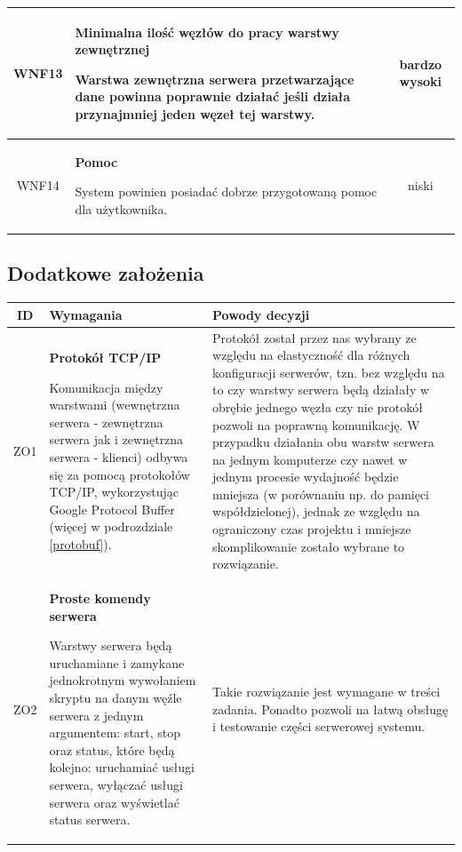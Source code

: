{\begin{tabularx}{\textwidth}{|c|X|c|}
\label{z:WNF13} WNF13 & \textbf{Minimalna ilość węzłów do pracy warstwy zewnętrznej} 
 
Warstwa zewnętrzna serwera przetwarzające dane powinna poprawnie działać jeśli działa przynajmniej jeden węzeł tej warstwy.
 & bardzo wysoki\\
\hline

\label{z:WNF14} WNF14 & \textbf{Pomoc} 
 
System powinien posiadać dobrze przygotowaną pomoc dla użytkownika.
 & niski \\
\hline

\end{tabularx}


\subsection[Dodatkowe założenia]{Dodatkowe założenia}

\begin{tabularx}{\textwidth}{|c|X|X|}
\hline
\textbf{ID} & \textbf{Wymagania}  & \textbf{Powody decyzji} \\
\hline

\label{z:ZO1} ZO1 &  \textbf{Protokół TCP/IP }

Komunikacja między warstwami (wewnętrzna serwera - zewnętrzna serwera jak i zewnętrzna serwera - klienci) odbywa się za pomocą protokołów TCP/IP, wykorzystując Google Protocol Buffer (więcej w podrozdziale \ref{protobuf}). & 
Protokół został przez nas wybrany ze względu na elastyczność dla różnych konfiguracji serwerów, tzn. bez względu na to czy warstwy serwera będą działały w obrębie jednego węzła czy nie protokół pozwoli na poprawną komunikację. W przypadku działania obu warstw serwera na jednym komputerze czy nawet w jednym procesie wydajność będzie mniejsza (w porównaniu np. do pamięci współdzielonej), jednak ze względu na ograniczony czas projektu i mniejsze skomplikowanie zostało wybrane to rozwiązanie. \\
\hline

\label{z:ZO2} ZO2 &  \textbf{Proste komendy serwera}

Warstwy serwera będą uruchamiane i zamykane jednokrotnym wywołaniem skryptu na danym węźle serwera z jednym argumentem: start, stop oraz status, które będą kolejno: uruchamiać usługi serwera, wyłączać usługi serwera oraz wyświetlać status serwera. & 
Takie rozwiązanie jest wymagane w treści zadania. Ponadto pozwoli na łatwą obsługę i testowanie części serwerowej systemu. \\
\hline


\end{tabularx}}
